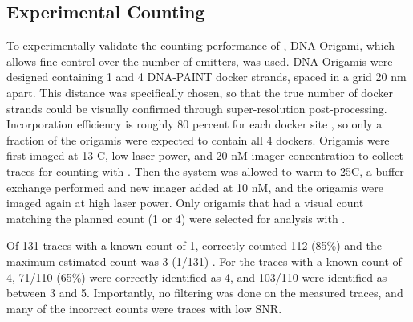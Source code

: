 \subsection{Experimental Counting}
To experimentally validate the counting performance of \ours, DNA-Origami, which allows fine control over the number of emitters, was used.
	DNA-Origamis were designed containing 1 and 4 DNA-PAINT docker strands, spaced in a grid 20 nm apart. 
	This distance was specifically chosen, so that the true number of docker strands could be visually confirmed through super-resolution post-processing.
	Incorporation efficiency is roughly 80 percent for each docker site \cite{strauss_2018}, so only a fraction of the origamis were expected to contain all 4 dockers. 
	Origamis were first imaged at 13 C, low laser power, and 20 nM imager concentration to collect traces for counting with \ours {}.
	Then the system was allowed to warm to 25C, a buffer exchange performed and new imager added at 10 nM, and the origamis were imaged again at high laser power.
	Only origamis that had a visual count matching the planned count (1 or 4) were selected for analysis with \ours.

Of 131 traces with a known count of 1, \ours correctly counted 112 (85\%) and the maximum estimated count was 3 (1/131) \figref{}.
	For the traces with a known count of 4, 71/110 (65\%) were correctly identified as 4, and 103/110 were identified as between 3 and 5.
	Importantly, no filtering was done on the measured traces, and many of the incorrect counts were traces with low SNR. %
